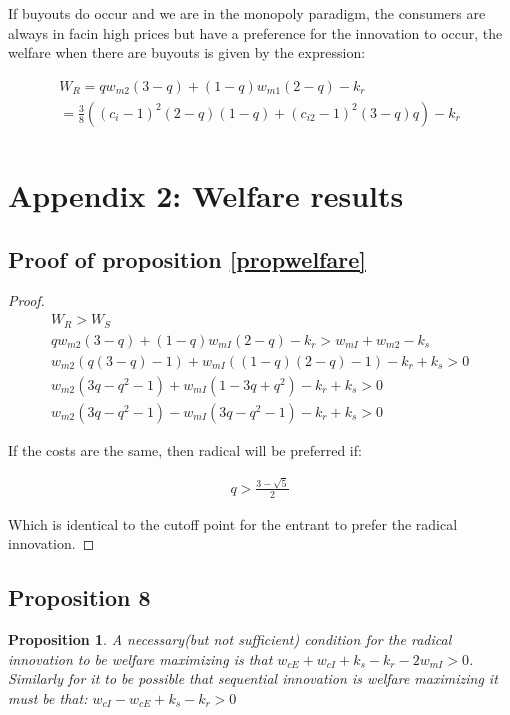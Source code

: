 \documentclass[11pt]{article}
\newtheorem{proposition}{Proposition}
\begin{document}
If buyouts do occur and we are in the monopoly paradigm, the consumers are always in facin high prices but have a preference for the innovation to occur, the welfare when there are buyouts is given by the expression:

\begin{align*}
    W_R = q w_{m2}(3-q )
+(1-q)w_{m1}(2-q) -k_r \\
= \frac{3}{8} \left((c_i-1)^2 (2-q) (1-q)+(c_{i2}-1)^2 (3-q) q\right) -k_r\\
\end{align*}

\section*{Appendix 2: Welfare results}

\subsection{Proof of proposition \ref{propwelfare}}

\begin{proof} \label{buyoutnobuyout}
\begin{align*}
W_R> W_S \\
q w_{m2}(3-q )
+(1-q)w_{mI}(2-q) -k_r > w_{mI} + w_{m2}-k_s \\
 w_{m2}(q(3-q) -1)
+w_{mI}((1-q)(2-q)-1) -k_r+k_s > 0 \\
w_{m2}(3q-q^2-1)+w_{mI}(1-3q+q^2)-k_r+k_s>0 \\
 w_{m2}(3q-q^2-1)-w_{mI}(3q-q^2-1)
-k_r+k_s>0 
\end{align*}

If the costs are the same, then radical will be preferred if:

\begin{align}
q> \frac{3-\sqrt{5}}{2}
\end{align}

Which is identical to the cutoff point for the entrant to prefer the radical innovation. 

\end{proof}

\subsection{Proposition 8}

\begin{proposition}
\label{welfare1}
A necessary(but not sufficient) condition for the radical innovation to be welfare maximizing is that $w_{cE}+w_{cI}+k_s -k_r-2 w_{mI} > 0 $. 
Similarly for it to be possible that sequential innovation is welfare maximizing it must be that: 
$w_{cI}-w_{cE}+k_s -k_r  > 0$
\end{proposition}
\end{document}
